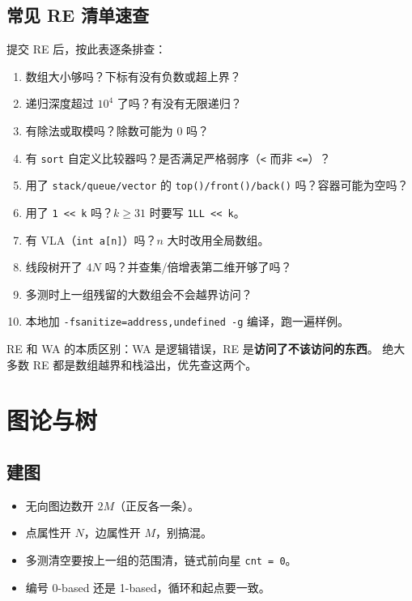 \documentclass[UTF8,openany,oneside,zihao=-4]{ctexbook}
\begin{document}
\section{常见 RE 清单速查}

\begin{note}
提交 RE 后，按此表逐条排查：
\end{note}

\begin{enumerate}
  \item 数组大小够吗？下标有没有负数或超上界？
  \item 递归深度超过 $10^4$ 了吗？有没有无限递归？
  \item 有除法或取模吗？除数可能为 0 吗？
  \item 有 \lstinline|sort| 自定义比较器吗？是否满足严格弱序（\lstinline|<| 而非 \lstinline|<=|）？
  \item 用了 \lstinline|stack/queue/vector| 的 \lstinline|top()/front()/back()| 吗？容器可能为空吗？
  \item 用了 \lstinline|1 << k| 吗？$k \ge 31$ 时要写 \lstinline|1LL << k|。
  \item 有 VLA（\lstinline|int a[n]|）吗？$n$ 大时改用全局数组。
  \item 线段树开了 $4N$ 吗？并查集/倍增表第二维开够了吗？
  \item 多测时上一组残留的大数组会不会越界访问？
  \item 本地加 \lstinline|-fsanitize=address,undefined -g| 编译，跑一遍样例。
\end{enumerate}

\begin{tip}
RE 和 WA 的本质区别：WA 是逻辑错误，RE 是\textbf{访问了不该访问的东西}。
绝大多数 RE 都是数组越界和栈溢出，优先查这两个。
\end{tip}

\chapter{图论与树}

\section{建图}

\begin{itemize}
  \item 无向图边数开 $2M$（正反各一条）。
  \item 点属性开 $N$，边属性开 $M$，别搞混。
  \item 多测清空要按上一组的范围清，链式前向星 \lstinline|cnt = 0|。
  \item 编号 0-based 还是 1-based，循环和起点要一致。
\end{itemize}
\end{document}
